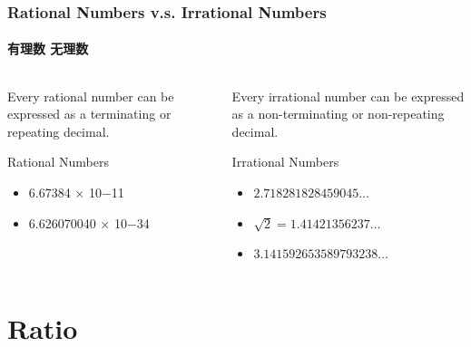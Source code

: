\documentclass[
	11pt, %
]{beamer}
\begin{document}
\begin{frame}
\frametitle{Rational Numbers v.s. Irrational Numbers}
\framesubtitle{有理数 无理数}

	  \begin{columns}[t] %
			\begin{column}{0.45\textwidth} %
							\begin{theorem}
								Every rational number can be expressed as a terminating or repeating decimal.
							\end{theorem}

						\begin{exampleblock}{Rational Numbers}
								\begin{itemize}
									\item 6.67384 × 10−11
									\item 6.626070040 × 10−34
								\end{itemize}							
						\end{exampleblock}
			\end{column}

			\begin{column}{0.5\textwidth} %
							\begin{theorem}
												Every irrational number can be expressed as a non-terminating or non-repeating decimal.
							\end{theorem}
			\begin{exampleblock}{Irrational Numbers}
								\begin{itemize}
									\item $2.718281828459045\ldots$
									\item $\sqrt{2} = 1.41421356237 \ldots$
									\item $3.141592653589793238 \ldots$
								\end{itemize}	
			\end{exampleblock}
			\end{column}
	\end{columns}
\end{frame}


\section{Ratio}
\end{document}
